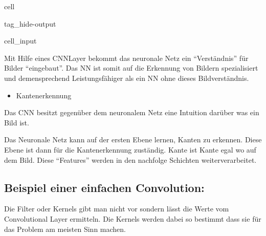 \documentclass[letterpaper,10pt,english]{jupyterBook}
\begin{document}
\begin{sphinxuseclass}{cell}
\begin{sphinxuseclass}{tag_hide-output}\begin{sphinxVerbatimInput}

\begin{sphinxuseclass}{cell_input}
\begin{sphinxVerbatim}[commandchars=\\\{\}]
 
\PYG{p}{[}\PYG{p}{]}  
\end{sphinxVerbatim}

\end{sphinxuseclass}\end{sphinxVerbatimInput}

\end{sphinxuseclass}
\end{sphinxuseclass}
\sphinxAtStartPar
Mit Hilfe eines CNN\sphinxhyphen{}Layer bekommt das neuronale Netz ein “Verständnis” für Bilder “eingebaut”. Das NN ist somit auf die Erkennung von Bildern spezialisiert und demensprechend Leistungsfähiger als ein NN ohne dieses Bildverständnis.
\begin{itemize}
\item {} 
\sphinxAtStartPar
Kantenerkennung

\end{itemize}

\sphinxAtStartPar
Das CNN besitzt gegenüber dem neuronalem Netz eine Intuition darüber was ein Bild ist.

\sphinxAtStartPar
Das Neuronale Netz kann auf der ersten Ebene lernen, Kanten zu erkennen. Diese Ebene ist dann für die Kantenerkennung zuständig. Kante ist Kante egal wo auf dem Bild. Diese “Features” werden in den nachfolge Schichten weiterverarbeitet.


\subsection{Beispiel einer einfachen Convolution:}
\label{\detokenize{03_CNN/CNN:beispiel-einer-einfachen-convolution}}
\sphinxAtStartPar
{}

\sphinxAtStartPar
Die Filter oder Kernels gibt man nicht vor sondern lässt die Werte vom Convolutional Layer ermitteln. Die Kernels werden dabei so bestimmt dass sie für das Problem am meisten Sinn machen.
\end{document}
